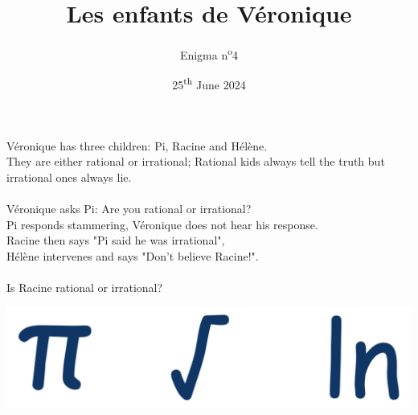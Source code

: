 \documentclass[a4paper, top=10mm]{article}
\title{\textbf{\huge{Les enfants de Véronique}}}
\author{Enigma n\textsuperscript{o}4}
\date{25\textsuperscript{th} June 2024}
\begin{document}
	\maketitle
	
	\Large
	Véronique has three children: Pi, Racine and Hélène.\\
	They are either rational or irrational; Rational kids always tell the truth but irrational ones always lie.\\
	\\
	Véronique asks Pi: Are you rational or irrational?\\
	Pi responds stammering, Véronique does not hear his response.\\
	Racine then says "Pi said he was irrational",\\
	Hélène intervenes and says "Don’t believe Racine!".\\
	\\
	Is Racine rational or irrational?
	
	\vspace{1cm}
	
	\begin{center}
		\includegraphics[width=\linewidth]{04symbols.pdf}
	\end{center}
	
	
	
\end{document}
